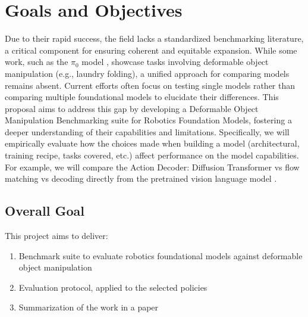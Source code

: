 \section{Goals and Objectives}
Due to their rapid success, the field lacks a standardized benchmarking literature, a critical component for ensuring coherent and equitable expansion. While some work, such as the $\pi_0$ model \cite{pi_zero}, showcase tasks involving deformable object manipulation (e.g., laundry folding), a unified approach for comparing models remains absent. Current efforts often focus on testing single models rather than comparing multiple foundational models to elucidate their differences. This proposal aims to address this gap by developing a Deformable Object Manipulation Benchmarking suite for Robotics Foundation Models, fostering a deeper understanding of their capabilities and limitations. Specifically, we will empirically evaluate how the choices made when building a model (architectural, training recipe, tasks covered, etc.) affect performance on the model capabilities. For example, we will compare the Action Decoder: Diffusion Transformer \cite{Gr00tN1} vs flow matching \cite{pi_zero} vs decoding directly from the pretrained vision language model \cite{OpenVLA}.

\subsection{Overall Goal}

This project aims to deliver:

    \begin{enumerate}
        \item Benchmark suite to evaluate robotics foundational models against deformable object manipulation
        \item Evaluation protocol, applied to the selected policies 
        \item Summarization of the work in a paper
    \end{enumerate}


